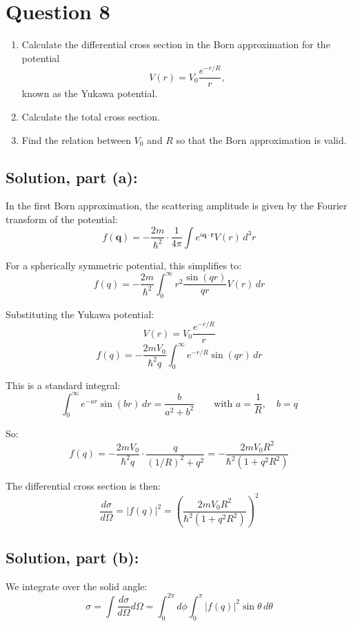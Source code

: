 \documentclass[12pt]{article}
\begin{document}
\section{Question 8}
    \begin{enumerate}
        \item[(a)] Calculate the differential cross section in the Born approximation for the potential
        \[
        V(r) = V_0 \frac{e^{-r/R}}{r},
        \]
        known as the Yukawa potential.
    
        \item[(b)] Calculate the total cross section.
    
        \item[(c)] Find the relation between \( V_0 \) and \( R \) so that the Born approximation is valid.
    \end{enumerate}

    \subsection{Solution, part (a):}
        In the first Born approximation, the scattering amplitude is given by the Fourier transform of the potential:
        \[
            f(\mathbf{q}) = -\frac{2m}{\hbar^2} \cdot \frac{1}{4\pi} \int e^{i \mathbf{q} \cdot \mathbf{r}} V(r) \, d^3r
        \]
        
        For a spherically symmetric potential, this simplifies to:
        \[
            f(q) = -\frac{2m}{\hbar^2} \int_0^\infty r^2 \frac{\sin(qr)}{qr} V(r) \, dr
        \]
        
        Substituting the Yukawa potential:
        \[
            V(r) = V_0 \frac{e^{-r/R}}{r}
        \]
        \[
            f(q) = -\frac{2m V_0}{\hbar^2 q} \int_0^\infty e^{-r/R} \sin(qr) \, dr
        \]
        
        This is a standard integral:
        \[
            \int_0^\infty e^{-ar} \sin(br) \, dr = \frac{b}{a^2 + b^2}
            \qquad \text{with } a = \frac{1}{R}, \quad b = q
        \]
        
        So:
        \[
            f(q) = -\frac{2m V_0}{\hbar^2 q} \cdot \frac{q}{(1/R)^2 + q^2}
            = -\frac{2m V_0 R^2}{\hbar^2 (1 + q^2 R^2)}
        \]
        
        The differential cross section is then:
        \[
            \frac{d\sigma}{d\Omega} = |f(q)|^2 = \left( \frac{2m V_0 R^2}{\hbar^2 (1 + q^2 R^2)} \right)^2
        \]

    \subsection{Solution, part (b):}
        We integrate over the solid angle:
        \[
            \sigma = \int \frac{d\sigma}{d\Omega} d\Omega
            = \int_0^{2\pi} d\phi \int_0^\pi \left| f(q) \right|^2 \sin\theta \, d\theta
        \]
        
\end{document}
